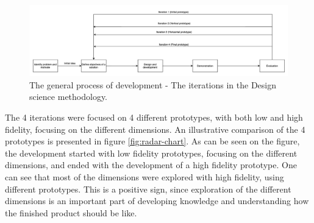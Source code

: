 \documentclass[pdftex,10pt,b5paper,twoside]{report}
\begin{document}
\begin{figure}[h!]
    \centering
    \includegraphics[width=\linewidth]{../images/workflow.png}
    \caption{The general process of development - The iterations in the Design science methodology.}
    \label{fig:workflow}
\end{figure}

The 4 iterations were focused on 4 different prototypes, with both low and high fidelity, focusing on the different dimensions. An illustrative comparison of the 4 prototypes is presented in figure \ref{fig:radar-chart}. As can be seen on the figure, the development started with low fidelity prototypes, focusing on the different dimensions, and ended with the development of a high fidelity prototype. One can see that most of the dimensions were explored with high fidelity, using different prototypes. This is a positive sign, since exploration of the different dimensions is an important part of developing knowledge and understanding how the finished product should be like. 
\end{document}
